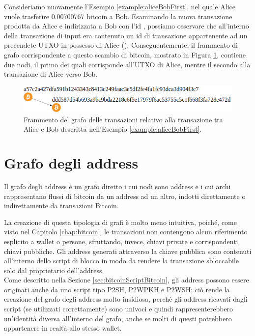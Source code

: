\begin{example}

Consideriamo nuovamente l’Esempio \ref{example:aliceBobFirst}, nel quale Alice vuole trasferire 0.00700767 bitcoin a Bob. Esaminando la nuova  transazione prodotta da Alice e indirizzata a Bob con l’id , possiamo osservare che all’interno della transazione di input era contenuto un id di transazione appartenente ad un precendete UTXO in possesso di Alice (). Conseguentemente, il frammento di grafo corrispondente a questo scambio di bitcoin, mostrato in Figura \ref{fig:graphtxproblem}, contiene due nodi, il primo dei quali corrisponde all'UTXO di Alice, mentre il secondo alla transazione di Alice verso Bob.

\begin{figure}
\centering
\includegraphics[scale=0.35]{images/exampleWithGraph/aliceBoxTx.png}
\caption{Frammento del grafo delle transazioni relativo alla  transazione tra Alice e Bob descritta nell’Esempio \ref{example:aliceBobFirst}.\label{fig:graphtxproblem}}
\end{figure}

\end{example}

\section{Grafo degli address} \label{sec:grafoDegliAddressProblema}

Il grafo degli address è un grafo diretto i cui nodi sono address e i cui archi rappresentano flussi di bitcoin da un address ad un altro, indotti direttamente o indirettamente da transazioni Bitcoin.

La creazione di questa tipologia di grafi è molto meno intuitiva, poiché, come visto nel Capitolo \ref{chap:bitcoin}, le transazioni non contengono alcun riferimento esplicito a wallet o persone, sfruttando, invece, chiavi private e corrispondenti chiavi pubbliche. Gli address generati attraverso la chiave pubblica sono contenuti all’interno dello script di blocco in modo da rendere la transazione sbloccabile solo dal proprietario dell’address. \\
Come descritto nella Sezione \ref{sec:bitcoinScriptBitcoin}, gli address possono essere originati anche da uno script tipo P2SH, P2WPKH e P2WSH; ciò rende la creazione del grafo degli address molto insidiosa, perché gli address ricavati dagli script (se utilizzati correttamente) sono univoci e quindi rappresenterebbero un’identità diversa all’interno del grafo, anche se molti di questi potrebbero appartenere in realtà allo stesso wallet.

